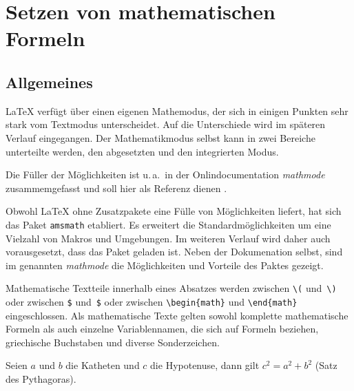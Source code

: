 

\section{Setzen von mathematischen Formeln} \label{math}


\subsection{Allgemeines}

\LaTeX{} verfügt über einen eigenen Mathemodus, der sich in einigen
Punkten sehr stark vom Textmodus unterscheidet. Auf die Unterschiede
wird im späteren Verlauf eingegangen. Der Mathematikmodus selbst
kann in zwei Bereiche unterteilte werden, 
den abgesetzten und den integrierten Modus.

Die Füller der Möglichkeiten ist u.\,a.\ in der Onlindocumentation \emph{mathmode}
zusammemgefasst und soll hier als Referenz dienen \cite{mathmode}.

Obwohl \LaTeX{} ohne Zusatzpakete eine Fülle von Möglichkeiten liefert,
hat sich das Paket \texttt{amsmath} etabliert. Es erweitert die Standardmöglichkeiten
um eine Vielzahl von Makros und Umgebungen. Im weiteren Verlauf wird daher auch
vorausgesetzt, dass das Paket geladen ist. Neben der Dokumenation selbst, sind im genannten
\emph{mathmode} die Möglichkeiten und Vorteile des Paktes gezeigt.
 
Mathematische Textteile innerhalb eines Absatzes werden zwischen
\lstinline|\(| und~\lstinline|\)| oder zwischen \lstinline|$| und~\lstinline|$| oder
zwischen \lstinline|\begin{math}| und \lstinline|\end{math}|
eingeschlossen.
Als mathematische Texte gelten sowohl komplette mathematische
Formeln als auch einzelne Variablennamen, die sich auf Formeln
beziehen, griechische Buchstaben und diverse Sonderzeichen.
\begin{LTXexample}
Seien $a$ und $b$ die Katheten
und $c$ die Hypotenuse,
dann gilt $c^{2}=a^{2}+b^{2}$
(Satz des Pythagoras).
\end{LTXexample}

